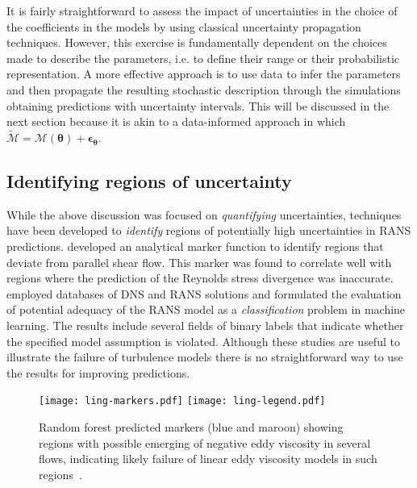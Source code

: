 \documentclass[a4paper]{ar-1col}
\begin{document}
It is fairly straightforward to assess the impact of uncertainties in the choice of the coefficients in the models by using classical uncertainty propagation techniques. However,
this exercise is fundamentally dependent on the choices made to describe the parameters, i.e. to define their range or their probabilistic representation. A more effective approach is to use data to infer the parameters and then propagate the resulting stochastic description through the simulations
obtaining predictions with uncertainty intervals. This will be discussed in the next section because it is akin to a data-informed approach in which $  \widetilde{ \mathcal M} = \mathcal M (\bm{\theta}) + \bm{\epsilon}_{ \bm{\theta}}$.

\subsection{Identifying regions of uncertainty}

While the above discussion was focused on {\em quantifying} uncertainties,  techniques have been developed to {\em identify} regions of potentially high uncertainties in RANS predictions.
\citet{gorle2014deviation} developed an analytical marker function to identify regions  that deviate from parallel shear
flow. This marker  was found to correlate well with regions  where the prediction of the Reynolds stress divergence was inaccurate. \citet{ling2015evaluation} employed databases of DNS and RANS solutions and formulated the evaluation of potential adequacy of the RANS model as a \emph{classification} problem in  machine learning. The results include several fields of binary labels that indicate whether the specified model assumption is violated.
Although these studies are useful to illustrate the failure of turbulence models there is no straightforward way to use the results for improving predictions.


 \begin{figure}[!htbp]
  \centering
  \begin{floatrow}\hspace{1.5cm}
 \texttt{[image: ling-markers.pdf]} %
  \texttt{[image: ling-legend.pdf]} %
 \end{floatrow}
 \vspace{0.5em}
  \caption{Random forest predicted markers (blue and maroon) showing regions with possible emerging of negative eddy viscosity in several flows, indicating likely failure of linear eddy viscosity models in such regions~\citep{ling2015evaluation}. 
  \label{fig:markers}}
\end{figure}
\end{document}
